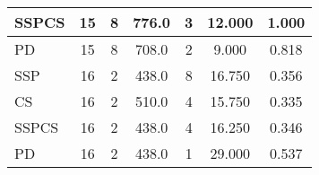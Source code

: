 \documentclass{article}
\begin{document}
\begin{table}[H]
{\begin{tabular}{|l|c|c|c|c|c|c|}
SSPCS              & 15             & 8                 & 776.0                  & 3              & 12.000                    & 1.000                                   \\ \hline
PD                 & 15             & 8                 & 708.0                  & 2              & 9.000                     & 0.818                                   \\ \hline
SSP                & 16             & 2                 & 438.0                  & 8              & 16.750                    & 0.356                                   \\ \hline
CS                 & 16             & 2                 & 510.0                  & 4              & 15.750                    & 0.335                                   \\ \hline
SSPCS              & 16             & 2                 & 438.0                  & 4              & 16.250                    & 0.346                                   \\ \hline
PD                 & 16             & 2                 & 438.0                  & 1              & 29.000                    & 0.537                                   \\ \hline
\end{tabular}%
}
\label{tab:simulation2_set2_algorithm_metrics}
\end{table}


\begin{table}[H]
\centering
\caption{Simulation 2, Set 3: Graph Characteristics}
\label{tab:simulation2_set3_graph_characteristics}
\end{table}
\end{document}
